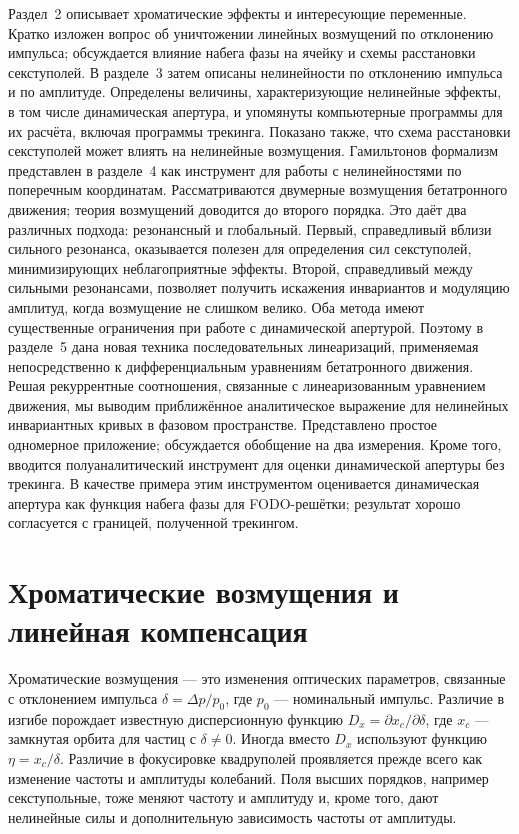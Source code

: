 \documentclass[11pt,a4paper]{article}
\begin{document}
Раздел~2 описывает хроматические эффекты и интересующие переменные. Кратко
изложен вопрос об уничтожении линейных возмущений по отклонению импульса;
обсуждается влияние набега фазы на ячейку и схемы расстановки секступолей.
В разделе~3 затем описаны нелинейности по отклонению импульса и по амплитуде.
Определены величины, характеризующие нелинейные эффекты, в том числе
динамическая апертура, и упомянуты компьютерные программы для их расчёта,
включая программы трекинга. Показано также, что схема расстановки секступолей
может влиять на нелинейные возмущения. Гамильтонов формализм представлен в
разделе~4 как инструмент для работы с нелинейностями по поперечным координатам.
Рассматриваются двумерные возмущения бетатронного движения; теория возмущений
доводится до второго порядка. Это даёт два различных подхода: резонансный и
глобальный. Первый, справедливый вблизи сильного резонанса, оказывается полезен
для определения сил секступолей, минимизирующих неблагоприятные эффекты.
Второй, справедливый между сильными резонансами, позволяет получить искажения
инвариантов и модуляцию амплитуд, когда возмущение не слишком велико.
Оба метода имеют существенные ограничения при работе с динамической апертурой.
Поэтому в разделе~5 дана новая техника последовательных линеаризаций,
применяемая непосредственно к дифференциальным уравнениям бетатронного
движения. Решая рекуррентные соотношения, связанные с линеаризованным
уравнением движения, мы выводим приближённое аналитическое выражение для
нелинейных инвариантных кривых в фазовом пространстве. Представлено простое
одномерное приложение; обсуждается обобщение на два измерения. Кроме того,
вводится полуаналитический инструмент для оценки динамической апертуры без
трекинга. В качестве примера этим инструментом оценивается динамическая
апертура как функция набега фазы для FODO-решётки; результат хорошо
согласуется с границей, полученной трекингом.

\section{Хроматические возмущения и линейная компенсация}

Хроматические возмущения --- это изменения оптических параметров, связанные с
отклонением импульса $\delta=\Delta p/p_0$, где $p_0$ --- номинальный импульс.
Различие в изгибе порождает известную дисперсионную функцию
$D_x=\partial x_c/\partial\delta$, где $x_c$ --- замкнутая орбита для частиц с
$\delta\neq 0$. Иногда вместо $D_x$ используют функцию $\eta=x_c/\delta$.
Различие в фокусировке квадруполей проявляется прежде всего как изменение
частоты и амплитуды колебаний. Поля высших порядков, например секступольные,
тоже меняют частоту и амплитуду и, кроме того, дают нелинейные силы и
дополнительную зависимость частоты от амплитуды.
\end{document}
